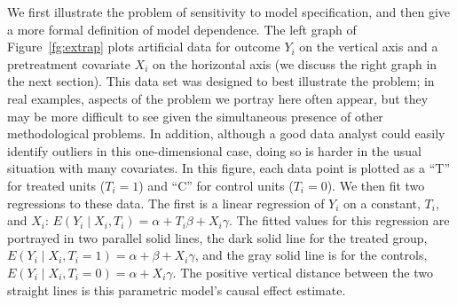 \documentclass[11pt,titlepage]{article}
\begin{document}
We first illustrate the problem of sensitivity to model specification,
and then give a more formal definition of model dependence.  The left
graph of Figure~\ref{fg:extrap} plots artificial data for outcome
$Y_i$ on the vertical axis and a pretreatment covariate $X_i$ on the
horizontal axis (we discuss the right graph in the next section).
This data set was designed to best illustrate the problem; in real
examples, aspects of the problem we portray here often appear, but
they may be more difficult to see given the simultaneous presence of
other methodological problems.  In addition, although a good data
analyst could easily identify outliers in this one-dimensional case,
doing so is harder in the usual situation with many covariates.  In
this figure, each data point is plotted as a ``T'' for treated units
($T_i=1$) and ``C'' for control units ($T_i=0$).  We then fit two
regressions to these data.  The first is a linear regression of $Y_i$
on a constant, $T_i$, and $X_i$: $E(Y_i\mid X_i,T_i)=\alpha + T_i\beta
+ X_i\gamma$.  The fitted values for this regression are portrayed in
two parallel solid lines, the dark solid line for the treated group,
$E(Y_i\mid X_i, T_i=1)=\alpha+\beta+X_i\gamma$, and the gray solid
line is for the controls, $E(Y_i\mid X_i,T_i=0)=\alpha+X_i\gamma$.
The positive vertical distance between the two straight lines is this
parametric model's causal effect estimate.
\end{document}
